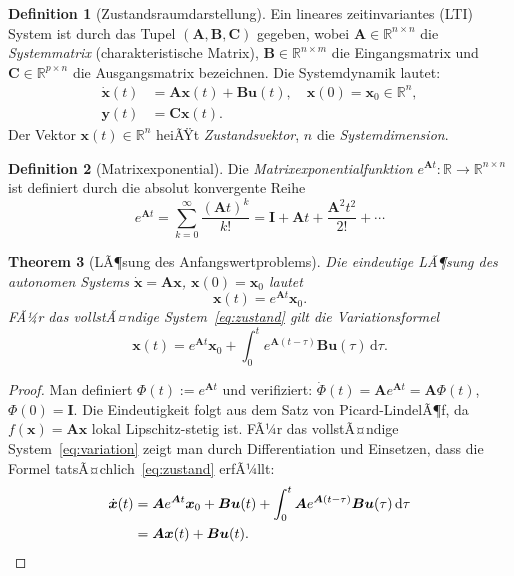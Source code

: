 ﻿\documentclass[12pt, a4paper, titlepage]{report}
\newtheorem{theorem}{Theorem}[section]
\theoremstyle{definition}
\newtheorem{definition}[theorem]{Definition}
\theoremstyle{remark}
\newcommand{\R}{\mathbb{R}}
\newcommand{\vx}{\bm{x}}
\newcommand{\vu}{\bm{u}}
\newcommand{\vy}{\bm{y}}
\newcommand{\vA}{\bm{A}}
\newcommand{\vB}{\bm{B}}
\newcommand{\vC}{\bm{C}}
\newcommand{\vI}{\bm{I}}
\begin{document}
\begin{definition}[Zustandsraumdarstellung]
\label{def:zrd}
Ein lineares zeitinvariantes (LTI) System ist durch das Tupel $(\vA, \vB, \vC)$ gegeben,
wobei $\vA \in \R^{n \times n}$ die \emph{Systemmatrix} (charakteristische Matrix),
$\vB \in \R^{n \times m}$ die Eingangsmatrix und $\vC \in \R^{p \times n}$ die
Ausgangsmatrix bezeichnen. Die Systemdynamik lautet:
\begin{align}
  \dot{\vx}(t) &= \vA\vx(t) + \vB\vu(t), \quad \vx(0) = \vx_0 \in \R^n,
    \label{eq:zustand} \\
  \vy(t) &= \vC\vx(t). \label{eq:ausgang}
\end{align}
Der Vektor $\vx(t) \in \R^n$ heiÃŸt \emph{Zustandsvektor}, $n$ die
\emph{Systemdimension}.
\end{definition}

\begin{definition}[Matrixexponential]
\label{def:matexp}
Die \emph{Matrixexponentialfunktion} $e^{\vA t} : \R \to \R^{n \times n}$ ist definiert
durch die absolut konvergente Reihe
\begin{equation}
  e^{\vA t} = \sum_{k=0}^{\infty} \frac{(\vA t)^k}{k!} = \vI + \vA t + \frac{\vA^2 t^2}{2!} + \cdots
  \label{eq:matexp}
\end{equation}
\end{definition}

\begin{theorem}[LÃ¶sung des Anfangswertproblems]
\label{thm:loesung}
Die eindeutige LÃ¶sung des autonomen Systems $\dot{\vx} = \vA\vx$,
$\vx(0) = \vx_0$ lautet
\begin{equation}
  \vx(t) = e^{\vA t}\vx_0.
  \label{eq:loesung}
\end{equation}
FÃ¼r das vollstÃ¤ndige System~\eqref{eq:zustand} gilt die Variationsformel
\begin{equation}
  \vx(t) = e^{\vA t}\vx_0 + \int_0^t e^{\vA(t-\tau)}\vB\vu(\tau)\,\mathrm{d}\tau.
  \label{eq:variation}
\end{equation}
\end{theorem}

\begin{proof}
Man definiert $\Phi(t) := e^{\vA t}$ und verifiziert:
$\dot{\Phi}(t) = \vA e^{\vA t} = \vA\Phi(t)$, $\Phi(0) = \vI$.
Die Eindeutigkeit folgt aus dem Satz von Picard-LindelÃ¶f, da $f(\vx) = \vA\vx$ lokal
Lipschitz-stetig ist. FÃ¼r das vollstÃ¤ndige System~\eqref{eq:variation} zeigt man
durch Differentiation und Einsetzen, dass die Formel tatsÃ¤chlich~\eqref{eq:zustand}
erfÃ¼llt:
\begin{align*}
  \dot{\vx}(t) &= \vA e^{\vA t}\vx_0 + \vB\vu(t) + \int_0^t \vA e^{\vA(t-\tau)}\vB\vu(\tau)\,\mathrm{d}\tau \\
               &= \vA\vx(t) + \vB\vu(t). \qedhere
\end{align*}
\end{proof}
\end{document}
